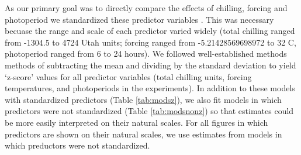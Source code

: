 \documentclass{article}
\begin{document}
\par As our primary goal was to directly compare the effects of chilling, forcing and photoperiod we standardized these predictor variables \citep{gelman2006}. This was necessary becuase the range and scale of each predictor varied widely (total chilling ranged from -1304.5 to 4724 Utah units; forcing ranged from -5.21428569698972 to 32 \degree C, photoperiod ranged from 6 to 24 hours). We followed well-established methods methods of subtracting the mean and dividing by the standard deviation \citep{gelman2006} to yield `z-score' values for all predictor variables (total chilling units, forcing temperatures, and photoperiods in the experiments).  In addition to these models with standardized predictors (Table \ref{tab:modsz}), we also fit models in which predictors were not standardized (Table \ref{tab:modsnonz}) so that estimates could be more easily interpreted on their natural scales. For all figures in which predictors are shown on their natural scales, we use estimates from models in which preductors were not standardized. 
\end{document}
